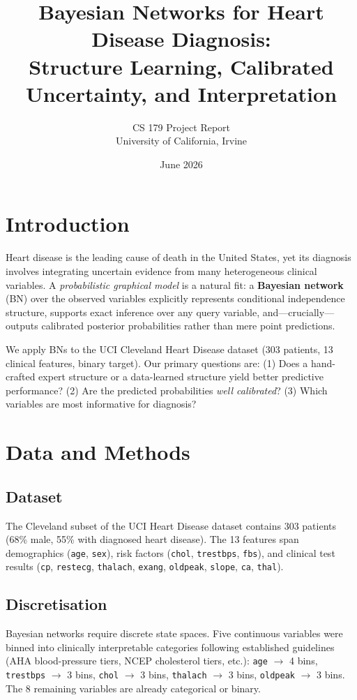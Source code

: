 \documentclass[10pt,twocolumn]{article}
\title{\textbf{Bayesian Networks for Heart Disease Diagnosis:\\
Structure Learning, Calibrated Uncertainty, and Interpretation}}
\author{CS 179 Project Report\\University of California, Irvine}
\date{June 2026}
\begin{document}
\maketitle

\section{Introduction}
Heart disease is the leading cause of death in the United States, yet its
diagnosis involves integrating uncertain evidence from many heterogeneous
clinical variables. A \textit{probabilistic graphical model} is a natural
fit: a \textbf{Bayesian network} (BN) over the observed variables explicitly
represents conditional independence structure, supports exact inference over any
query variable, and---crucially---outputs calibrated posterior probabilities
rather than mere point predictions.

We apply BNs to the UCI Cleveland Heart Disease dataset (303 patients,
13 clinical features, binary target). Our primary questions are: (1) Does
a hand-crafted expert structure or a data-learned structure yield better
predictive performance? (2) Are the predicted probabilities \textit{well
calibrated}? (3) Which variables are most informative for diagnosis?

\section{Data and Methods}

\subsection{Dataset}
The Cleveland subset of the UCI Heart Disease dataset contains 303 patients
(68\% male, 55\% with diagnosed heart disease). The 13 features span demographics
(\texttt{age}, \texttt{sex}), risk factors (\texttt{chol}, \texttt{trestbps},
\texttt{fbs}), and clinical test results (\texttt{cp}, \texttt{restecg},
\texttt{thalach}, \texttt{exang}, \texttt{oldpeak}, \texttt{slope}, \texttt{ca},
\texttt{thal}).

\subsection{Discretisation}
Bayesian networks require discrete state spaces. Five continuous variables were
binned into clinically interpretable categories following established guidelines
(AHA blood-pressure tiers, NCEP cholesterol tiers, etc.):
\texttt{age} $\to$ 4 bins, \texttt{trestbps} $\to$ 3 bins, \texttt{chol} $\to$ 3 bins,
\texttt{thalach} $\to$ 3 bins, \texttt{oldpeak} $\to$ 3 bins.
The 8 remaining variables are already categorical or binary.
\end{document}
